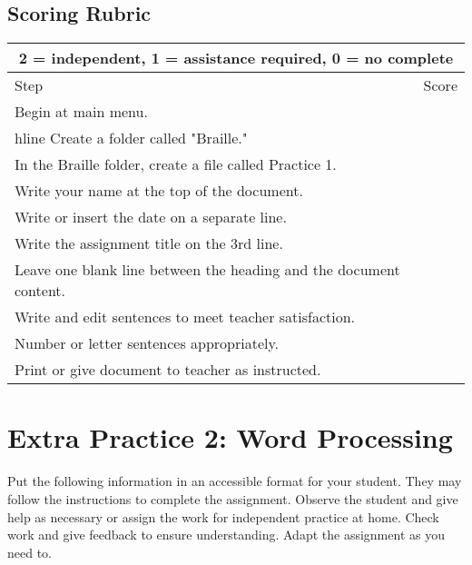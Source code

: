 \documentclass[10pt,letterpaper,twoside]{report}
\begin{document}
{\clearpage
\subsection{Scoring Rubric}
{
	\renewcommand{\arraystretch}{1.5}
	\begin{table}[!htbp]
		\centering
		\begin{tabular}{|l|r|}
			\hline
			\multicolumn{2}{|c|}{2 = independent, 1 = assistance required, 0 = no complete} \\
			\hline
			Step                                                               & Score \\[.5em]
			\hline
			Begin at main menu.                                                &       \\hline
			Create a folder called "Braille."                                  &       \\ \hline
			In the Braille folder, create a file called Practice 1.            &       \\ \hline
			Write your name at the top of the document.                        &       \\ \hline
			Write or insert the date on a separate line.                       &       \\ \hline
			Write the assignment title on the 3rd line.                        &       \\ \hline
			Leave one blank line between the heading and the document content. &       \\ \hline
			Write and edit sentences to meet teacher satisfaction.             &       \\ \hline
			Number or letter sentences appropriately.                          &       \\ \hline
			Print or give document to teacher as instructed.                   &       \\ \hline
		\end{tabular}
		
	\end{table}
}

\clearpage
\section{Extra Practice 2: Word Processing}
Put the following information in an accessible format for your student. They may follow the instructions to complete the assignment. Observe the student and give help as necessary or assign the work for independent practice at home. Check work and give feedback to ensure understanding. Adapt the assignment as you need to.
}
\end{document}
